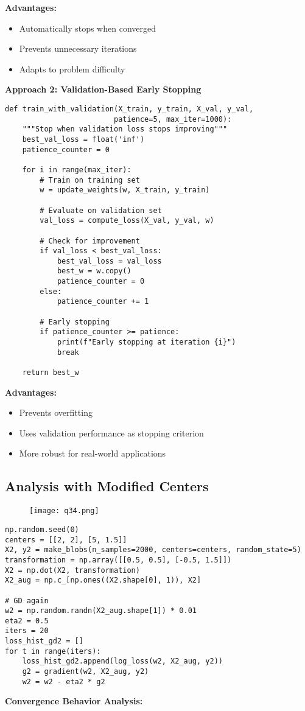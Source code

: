 \documentclass[12pt]{article}
\begin{document}
\textbf{Advantages:}
\begin{itemize}
    \item Automatically stops when converged
    \item Prevents unnecessary iterations
    \item Adapts to problem difficulty
\end{itemize}

\textbf{Approach 2: Validation-Based Early Stopping}

\begin{lstlisting}[caption={Validation-based early stopping}]
def train_with_validation(X_train, y_train, X_val, y_val, 
                         patience=5, max_iter=1000):
    """Stop when validation loss stops improving"""
    best_val_loss = float('inf')
    patience_counter = 0
    
    for i in range(max_iter):
        # Train on training set
        w = update_weights(w, X_train, y_train)
        
        # Evaluate on validation set
        val_loss = compute_loss(X_val, y_val, w)
        
        # Check for improvement
        if val_loss < best_val_loss:
            best_val_loss = val_loss
            best_w = w.copy()
            patience_counter = 0
        else:
            patience_counter += 1
            
        # Early stopping
        if patience_counter >= patience:
            print(f"Early stopping at iteration {i}")
            break
    
    return best_w
\end{lstlisting}

\textbf{Advantages:}
\begin{itemize}
    \item Prevents overfitting
    \item Uses validation performance as stopping criterion
    \item More robust for real-world applications
\end{itemize}

\subsection{Analysis with Modified Centers}
\begin{figure}[h]
    \centering
    \texttt{[image: q34.png]}
\end{figure}
\begin{lstlisting}
np.random.seed(0)
centers = [[2, 2], [5, 1.5]]
X2, y2 = make_blobs(n_samples=2000, centers=centers, random_state=5)
transformation = np.array([[0.5, 0.5], [-0.5, 1.5]])
X2 = np.dot(X2, transformation)
X2_aug = np.c_[np.ones((X2.shape[0], 1)), X2]

# GD again
w2 = np.random.randn(X2_aug.shape[1]) * 0.01
eta2 = 0.5
iters = 20
loss_hist_gd2 = []
for t in range(iters):
    loss_hist_gd2.append(log_loss(w2, X2_aug, y2))
    g2 = gradient(w2, X2_aug, y2)
    w2 = w2 - eta2 * g2
\end{lstlisting}
\textbf{Convergence Behavior Analysis:}
\end{document}
